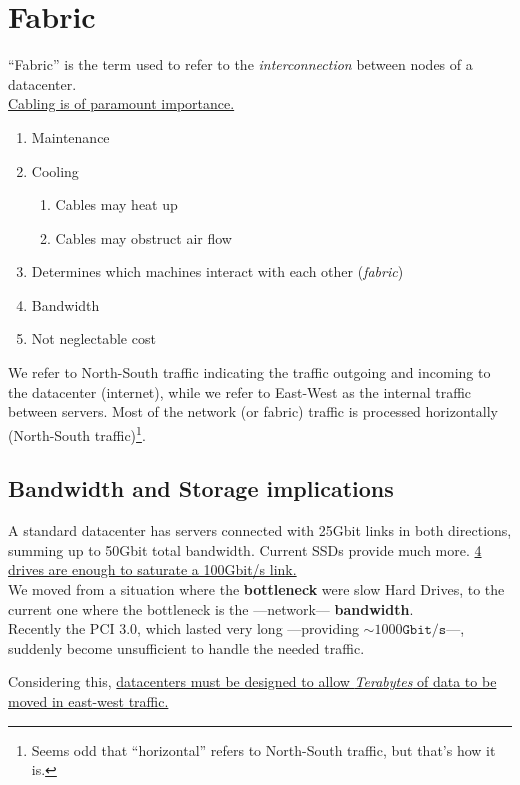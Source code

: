 \chapter{Fabric}
``Fabric'' is the term used to refer to the \textit{interconnection} between nodes of a datacenter.\\
\ul{Cabling is of paramount importance.}
\begin{enumerate}
   \item Maintenance
   \item Cooling
   \begin{enumerate}
      \item Cables may heat up
      \item Cables may obstruct air flow
   \end{enumerate}
   \item Determines which machines interact with each other (\textit{fabric})
   \item Bandwidth
   \item Not neglectable cost
\end{enumerate}

We refer to North-South traffic indicating the traffic outgoing and incoming to the datacenter (internet), while we refer to East-West as the internal traffic between servers.
Most of the network (or fabric) traffic is processed horizontally (North-South traffic)\footnote{Seems odd that ``horizontal'' refers to North-South traffic, but that's how it is.}.


\section{Bandwidth and Storage implications}
\label{sec:bandwidth_storage}
A standard datacenter has servers connected with 25Gbit links in both directions, summing up to 50Gbit total bandwidth.
Current SSDs provide much more. \ul{4 drives are enough to saturate a 100Gbit/s link.}\\
We moved from a situation where the \textbf{bottleneck} were slow Hard Drives, to the current one where the bottleneck is the ---network--- \textbf{bandwidth}.\\
Recently the PCI 3.0, which lasted very long ---providing $\sim 1000\texttt{Gbit/s}$---, suddenly become unsufficient to handle the needed traffic.

Considering this, \ul{datacenters must be designed to allow \textit{Terabytes} of data to be moved in east-west traffic.}


